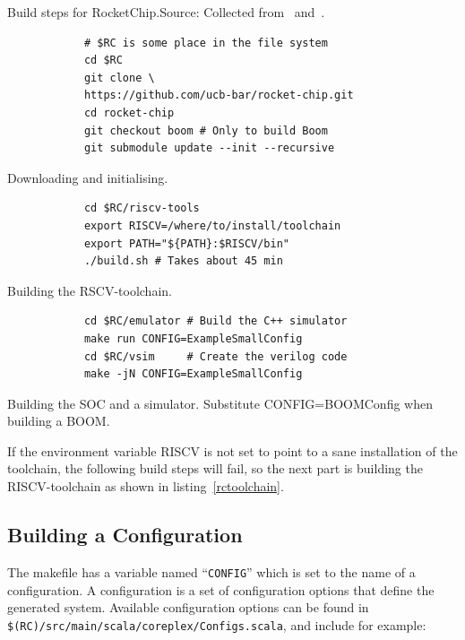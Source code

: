 \documentclass[journal,a4paper]{IEEEtran}
\begin{document}
\begin{table}
	\caption{Build steps for RocketChip.\newline\hspace{\linewidth}Source: Collected from~\cite{rc_github} and~\cite{boom_github}.}
	\begin{subtable}[b]{0.9\linewidth}
		\begin{verbatim}
			# $RC is some place in the file system
			cd $RC
			git clone \
			https://github.com/ucb-bar/rocket-chip.git
			cd rocket-chip
			git checkout boom # Only to build Boom
			git submodule update --init --recursive
		\end{verbatim}
		\caption{Downloading and initialising.}
		\label{rcclone}
	\end{subtable}
	\begin{subtable}[b]{0.9\linewidth}
		\begin{verbatim}
			cd $RC/riscv-tools
			export RISCV=/where/to/install/toolchain
			export PATH="${PATH}:$RISCV/bin"
			./build.sh # Takes about 45 min
		\end{verbatim}
		\caption{Building the RSCV-toolchain.}
		\label{rctoolchain}
	\end{subtable}
	\begin{subtable}[b]{0.8\linewidth}
		\begin{verbatim}
			cd $RC/emulator # Build the C++ simulator
			make run CONFIG=ExampleSmallConfig
			cd $RC/vsim     # Create the verilog code
			make -jN CONFIG=ExampleSmallConfig
		\end{verbatim}
		\caption{Building the SOC and a simulator. Substitute CONFIG=BOOMConfig when building a BOOM.}
		\label{rcmake}
	\end{subtable}
\end{table}

If the environment variable RISCV is not set to point to a sane installation of the toolchain, the following build steps will fail, so the next part is building the RISCV-toolchain as shown in listing~\ref{rctoolchain}.


\subsection{Building a Configuration}
The makefile has a variable named ``\texttt{CONFIG}'' which is set to the name of a configuration.
A configuration is a set of configuration options that define the generated system.
Available configuration options can be found in \texttt{\$(RC)/src/main/scala/coreplex/Configs.scala}, and include for example:
\end{document}
